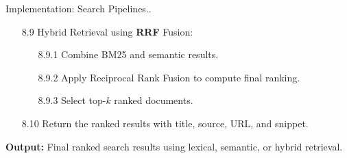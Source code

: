 \begin{frame}{Implementation: Search Pipelines..}
    
    \begin{itemize}
       
        \item[8.9] Hybrid Retrieval using \textbf{RRF} Fusion:
              \begin{itemize}
                  \item[8.9.1] Combine BM25 and semantic results.
                  \item[8.9.2] Apply Reciprocal Rank Fusion to compute final ranking.
                  \item[8.9.3] Select top-$k$ ranked documents.
              \end{itemize}
    
        \item[8.10] Return the ranked results with title, source, URL, and snippet.
    
    \end{itemize}

\textbf{Output:} Final ranked search results using lexical, semantic, or hybrid retrieval.

    
\end{frame}

